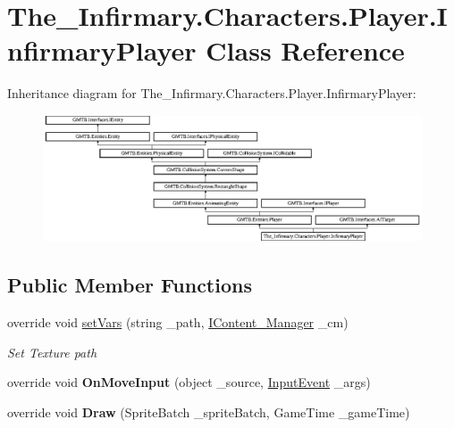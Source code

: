 \hypertarget{class_the___infirmary_1_1_characters_1_1_player_1_1_infirmary_player}{}\section{The\+\_\+\+Infirmary.\+Characters.\+Player.\+Infirmary\+Player Class Reference}
\label{class_the___infirmary_1_1_characters_1_1_player_1_1_infirmary_player}
Inheritance diagram for The\+\_\+\+Infirmary.\+Characters.\+Player.\+Infirmary\+Player\+:\begin{figure}[H]
\begin{center}
\leavevmode
\includegraphics[height=3.771044cm]{class_the___infirmary_1_1_characters_1_1_player_1_1_infirmary_player}
\end{center}
\end{figure}
\subsection*{Public Member Functions}
\begin{DoxyCompactItemize}
\item 
override void \mbox{\hyperlink{class_the___infirmary_1_1_characters_1_1_player_1_1_infirmary_player_a0833a307f7cb4ef7f1dd99f10e8db6e9}{set\+Vars}} (string \+\_\+path, \mbox{\hyperlink{interface_g_m_t_b_1_1_interfaces_1_1_i_content___manager}{I\+Content\+\_\+\+Manager}} \+\_\+cm)
\begin{DoxyCompactList}\small\item\em Set Texture path \end{DoxyCompactList}\item 
\mbox{\label{class_the___infirmary_1_1_characters_1_1_player_1_1_infirmary_player_a7258ca088507718a44bb2710ff45ceb3}} 
override void {\bfseries On\+Move\+Input} (object \+\_\+source, \mbox{\hyperlink{class_g_m_t_b_1_1_input_system_1_1_input_event}{Input\+Event}} \+\_\+args)
\item 
\mbox{\label{class_the___infirmary_1_1_characters_1_1_player_1_1_infirmary_player_ace45e14ec87eed076444fd89fce50c40}} 
override void {\bfseries Draw} (Sprite\+Batch \+\_\+sprite\+Batch, Game\+Time \+\_\+game\+Time)
\end{DoxyCompactItemize}
